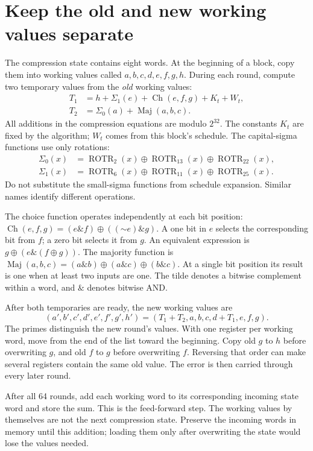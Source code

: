 \section{Keep the old and new working values separate}
The compression state contains eight words. At the beginning of a block, copy them
into working values called \(a,b,c,d,e,f,g,h\). During each round, compute two
temporary values from the \emph{old} working values:
\[
\begin{aligned}
T_1&=h+\Sigma_1(e)+\operatorname{Ch}(e,f,g)+K_t+W_t,\\
T_2&=\Sigma_0(a)+\operatorname{Maj}(a,b,c).
\end{aligned}
\]
All additions in the compression equations are modulo \(2^{32}\). The constants
\(K_t\) are fixed by the algorithm; \(W_t\) comes from this block's schedule.
The capital-sigma functions use only rotations:
\[
\begin{aligned}
\Sigma_0(x)&=\operatorname{ROTR}_2(x)\oplus\operatorname{ROTR}_{13}(x)
 \oplus\operatorname{ROTR}_{22}(x),\\
\Sigma_1(x)&=\operatorname{ROTR}_6(x)\oplus\operatorname{ROTR}_{11}(x)
 \oplus\operatorname{ROTR}_{25}(x).
\end{aligned}
\]
Do not substitute the small-sigma functions from schedule expansion. Similar names
identify different operations.

The choice function operates independently at each bit position:
\(\operatorname{Ch}(e,f,g)=(e\mathbin{\&}f)\oplus((\mathord{\sim}e)\mathbin{\&}g)\).
A one bit in \(e\) selects the corresponding bit from \(f\); a zero bit selects it
from \(g\). An equivalent expression is \(g\oplus(e\mathbin{\&}(f\oplus g))\).
The majority function is
\(\operatorname{Maj}(a,b,c)=(a\mathbin{\&}b)\oplus(a\mathbin{\&}c)\oplus(b\mathbin{\&}c)\).
At a single bit position its result is one when at least two inputs are one.
The tilde denotes a bitwise complement within a word, and \(\&\) denotes bitwise AND.

After both temporaries are ready, the new working values are
\[
(a',b',c',d',e',f',g',h')=
(T_1+T_2,a,b,c,d+T_1,e,f,g).
\]
The primes distinguish the new round's values. With one register per working word,
move from the end of the list toward the beginning. Copy old \(g\) to \(h\) before
overwriting \(g\), and old \(f\) to \(g\) before overwriting \(f\). Reversing that
order can make several registers contain the same old value. The error is then carried
through every later round.

After all 64 rounds, add each working word to its corresponding incoming state word
and store the sum. This is the feed-forward step. The working values by themselves
are not the next compression state. Preserve the incoming words in memory until this
addition; loading them only after overwriting the state would lose the values needed.
